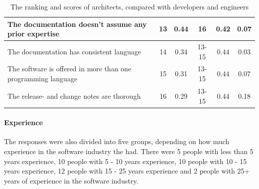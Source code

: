 \documentclass{article}
\begin{document}
\begin{table}[]
\begin{tabularx}{\columnwidth}{X|c:c|c:c|c|}
The documentation doesn't assume any prior expertise & 13 & 0.44 & 16 & 0.42 & 0.07  \\ \hline
The documentation has consistent language & 14 & 0.34 & 13-15 & 0.44 & 0.03  \\ \hline
The software is offered in more than one programming language & 15 & 0.31       & 13-15 & 0.44 & 0.07  \\ \hline
The release- and change notes are thorough & 16 & 0.29 &        13-15 & 0.44 & 0.18  \\ \hline
\end{tabularx}
\caption{The ranking and scores of architects, compared with developers and engineers}
\label{tab:arch-devs}
\end{table}


\paragraph{Experience}

The responses were also divided into five groups, depending on how much
experience in the software industry the had. There were 5 people with
less than 5 years experience, 10 people with 5 - 10 years experience, 10
people with 10 - 15 years experience, 12 people with 15 - 25 years
experience and 2 people with 25+ years of experience in the software
industry.
\end{document}
